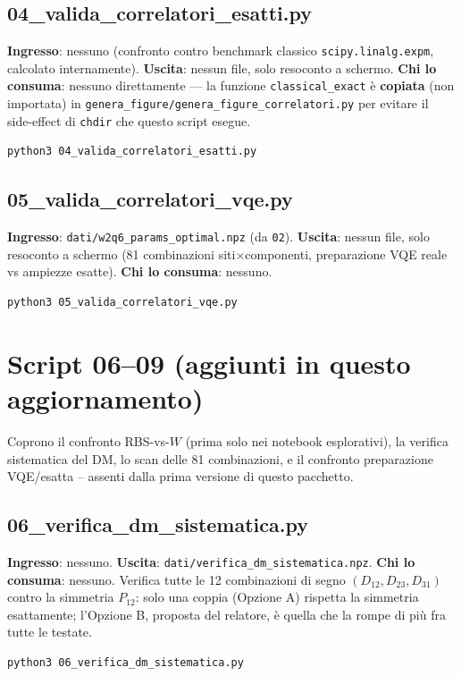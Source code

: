 \documentclass[11pt,a4paper]{article}
\begin{document}
\subsection{04\_valida\_correlatori\_esatti.py}
\textbf{Ingresso}: nessuno (confronto contro benchmark classico
\texttt{scipy.linalg.expm}, calcolato internamente). \textbf{Uscita}:
nessun file, solo resoconto a schermo. \textbf{Chi lo consuma}: nessuno
direttamente --- la funzione \texttt{classical\_exact} è \textbf{copiata}
(non importata) in \texttt{genera\_figure/genera\_figure\_correlatori.py}
per evitare il side-effect di \texttt{chdir} che questo script esegue.
\begin{verbatim}
python3 04_valida_correlatori_esatti.py
\end{verbatim}

\subsection{05\_valida\_correlatori\_vqe.py}
\textbf{Ingresso}: \texttt{dati/w2q6\_params\_optimal.npz} (da
\texttt{02}). \textbf{Uscita}: nessun file, solo resoconto a schermo
(81 combinazioni siti$\times$componenti, preparazione VQE reale vs
ampiezze esatte). \textbf{Chi lo consuma}: nessuno.
\begin{verbatim}
python3 05_valida_correlatori_vqe.py
\end{verbatim}

\section{Script 06--09 (aggiunti in questo aggiornamento)}
\label{sec:aggiornamento}

Coprono il confronto RBS-vs-$W$ (prima solo nei notebook esplorativi),
la verifica sistematica del DM, lo scan delle 81 combinazioni, e il
confronto preparazione VQE/esatta -- assenti dalla prima versione di
questo pacchetto.

\subsection{06\_verifica\_dm\_sistematica.py}
\textbf{Ingresso}: nessuno. \textbf{Uscita}:
\texttt{dati/verifica\_dm\_\allowbreak sistematica.npz}. \textbf{Chi lo
consuma}: nessuno. Verifica tutte le 12 combinazioni di segno
$(D_{12},D_{23},D_{31})$ contro la simmetria $P_{12}$: solo una coppia
(Opzione A) rispetta la simmetria esattamente; l'Opzione B, proposta
del relatore, è quella che la rompe di più fra tutte le testate.
\begin{verbatim}
python3 06_verifica_dm_sistematica.py
\end{verbatim}
\end{document}
